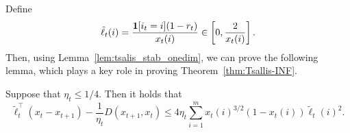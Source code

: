 Define 
\begin{equation}
    \tilde{\ell}_t(i)
    =
    \frac{\operatorname{\boldsymbol{1}}[i_t=i](1 - r_t)}{x_t(i)} \in \left[0, \frac{2}{x_t(i)} \right]
    .
    \nonumber
\end{equation}
Then, using Lemma~\ref{lem:tsalis_stab_onedim}, we can prove the following lemma, which plays a key role in proving Theorem~\ref{thm:Tsallis-INF}.
\begin{lemma}\label{lem:tsalis_stab_multidim}
Suppose that $\eta_t \leq 1/4$.
Then it holds that
\begin{equation}
        \tilde{\ell}_t^\top 
    (x_t - x_{t+1})
    -
    \frac{1}{\eta_t} D(x_{t+1}, x_t)
    \leq
    4
    \eta_t
    \sum_{i=1}^m
    x_t(i)^{3/2} (1 - x_t(i))
    \tilde{\ell}_t(i)^2
    .
    \nonumber
\end{equation}
\end{lemma}
